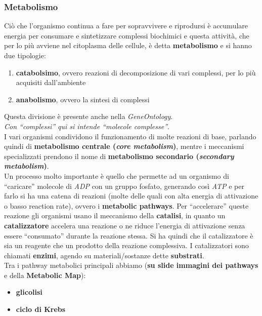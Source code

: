\documentclass[a4paper,12pt, oneside]{book}
\begin{document}
\subsubsection{Metabolismo}
Ciò che l'organismo continua a fare per sopravvivere e riprodursi è accumulare
energia per consumare e sintetizzare complessi biochimici e questa attività, che
per lo più avviene nel citoplasma delle cellule, è detta \textbf{metabolismo} e
si hanno due tipologie:
\begin{enumerate}
  \item \textbf{catabolsimo}, ovvero reazioni di decomposizione di vari
  complessi, per lo più acquisiti dall'ambiente 
  \item \textbf{anabolismo}, ovvero la sintesi di complessi
\end{enumerate}
Questa divisione è presente anche nella \textit{GeneOntology}.\\
\textit{Con ``complessi'' qui si intende ``molecole complesse''}.\\
I vari organismi condividono il funzionamento di molte reazioni di base,
parlando quindi di \textbf{metabolismo centrale (\textit{core metabolism})},
mentre i meccanismi specializzati prendono il nome di \textbf{metabolismo
  secondario (\textit{secondary metabolism})}.\\
Un processo molto importante è quello che permette ad un organismo di
``caricare'' molecole di \textit{ADP} con un gruppo fosfato, generando così
\textit{ATP} e per farlo si ha una catena di reazioni (molte delle quali con
alta energia di attivazione o basso reaction rate), ovvero i \textbf{metabolic
  pathways}. Per ``accelerare'' queste reazione gli organismi usano il
meccanismo della \textbf{catalisi}, in quanto un \textbf{catalizzatore} accelera
una reazione o ne riduce l'energia di attivazione senza essere ``consumato''
durante la reazione stessa. Si ha quindi che il catalizzatore è sia un reagente
che un prodotto della reazione complessiva. I catalizzatori sono chiamati
\textbf{enzimi}, agendo su materiali/sostanze dette \textbf{substrati}.\\
Tra i pathway metabolici principali abbiamo (\textbf{su slide immagini dei
  pathways} e della \textbf{Metabolic Map}): 
\begin{itemize}
  \item \textbf{glicolisi}
  \item \textbf{ciclo di Krebs}
\end{itemize}
\end{document}

